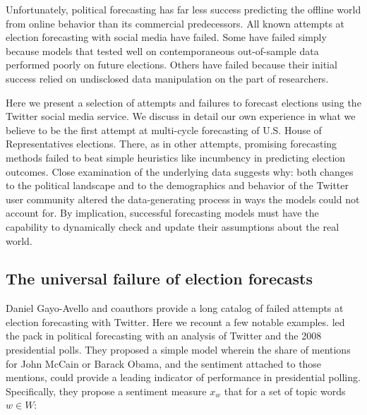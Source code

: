\documentclass{article}
\begin{document}
Unfortunately, political forecasting has far less success predicting
the offline world from online behavior than its commercial
predecessors. All known attempts at election forecasting with social
media have failed. Some have failed simply because models that tested
well on contemporaneous out-of-sample data performed poorly on future
elections. Others have failed because their initial success relied on
undisclosed data manipulation on the part of researchers.

Here we present a selection of attempts and failures to forecast
elections using the Twitter social media service. We discuss in detail
our own experience in what we believe to be the first attempt at
multi-cycle forecasting of U.S. House of Representatives
elections. There, as in other attempts, promising forecasting methods
failed to beat simple heuristics like incumbency in predicting
election outcomes. Close examination of the underlying data suggests
why: both changes to the political landscape and to the demographics
and behavior of the Twitter user community altered the data-generating
process in ways the models could not account for. By implication,
successful forecasting models must have the capability to dynamically
check and update their assumptions about the real world. 





\subsection{The universal failure of election forecasts}
\label{sec:univ-fail-elect}

Daniel Gayo-Avello and coauthors \citep{gayo2011limits,metaxas2011not}
provide a long catalog of failed attempts at election forecasting with
Twitter. Here we recount a few notable examples. \cite{o2010tweets}
led the pack in political forecasting with an analysis of Twitter and
the 2008 presidential polls. They proposed a simple model wherein the
share of mentions for John McCain or Barack Obama, and the sentiment
attached to those mentions, could provide a leading indicator of
performance in presidential polling. Specifically, they propose a
sentiment measure $x_w$ that for a set of topic words $w \in W$:
\end{document}
